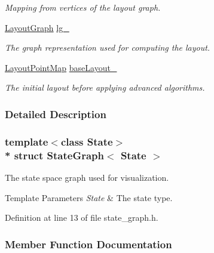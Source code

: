 \begin{DoxyCompactItemize}
\begin{DoxyCompactList}\small\item\em Mapping from vertices of the layout graph. \end{DoxyCompactList}\item 
\hyperlink{structStateGraph_a762277e4513dcf34ff0db4418b77a03f}{Layout\+Graph} \hyperlink{structStateGraph_a5b89661d2ac96111ab34827449317e02}{lg\+\_\+}\hypertarget{structStateGraph_a5b89661d2ac96111ab34827449317e02}{}\label{structStateGraph_a5b89661d2ac96111ab34827449317e02}

\begin{DoxyCompactList}\small\item\em The graph representation used for computing the layout. \end{DoxyCompactList}\item 
\hyperlink{structStateGraph_aaeed59fc6303247c00c54a421334ac13}{Layout\+Point\+Map} \hyperlink{structStateGraph_a5b24ce9223dfe7b0da03bca81388da19}{base\+Layout\+\_\+}\hypertarget{structStateGraph_a5b24ce9223dfe7b0da03bca81388da19}{}\label{structStateGraph_a5b24ce9223dfe7b0da03bca81388da19}

\begin{DoxyCompactList}\small\item\em The initial layout before applying advanced algorithms. \end{DoxyCompactList}\end{DoxyCompactItemize}


\subsubsection{Detailed Description}
\subsubsection*{template$<$class State$>$\\*
struct State\+Graph$<$ State $>$}

The state space graph used for visualization. 


\begin{DoxyTemplParams}{Template Parameters}
{\em State} & The state type. \\
\hline
\end{DoxyTemplParams}


Definition at line 13 of file state\+\_\+graph.\+h.



\subsubsection{Member Function Documentation}
